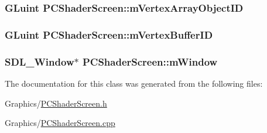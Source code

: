 \subsubsection[{\texorpdfstring{m\+Vertex\+Array\+Object\+ID}{mVertexArrayObjectID}}]{\setlength{\rightskip}{0pt plus 5cm}G\+Luint P\+C\+Shader\+Screen\+::m\+Vertex\+Array\+Object\+ID\hspace{0.3cm}{\ttfamily [private]}}\hypertarget{classPCShaderScreen_a3b4261546ea335e52da92f01db58ad4f}{}\label{classPCShaderScreen_a3b4261546ea335e52da92f01db58ad4f}
\subsubsection[{\texorpdfstring{m\+Vertex\+Buffer\+ID}{mVertexBufferID}}]{\setlength{\rightskip}{0pt plus 5cm}G\+Luint P\+C\+Shader\+Screen\+::m\+Vertex\+Buffer\+ID\hspace{0.3cm}{\ttfamily [private]}}\hypertarget{classPCShaderScreen_aab7c077141f13b13027c0e798e4457c2}{}\label{classPCShaderScreen_aab7c077141f13b13027c0e798e4457c2}
\subsubsection[{\texorpdfstring{m\+Window}{mWindow}}]{\setlength{\rightskip}{0pt plus 5cm}S\+D\+L\+\_\+\+Window$\ast$ P\+C\+Shader\+Screen\+::m\+Window\hspace{0.3cm}{\ttfamily [private]}}\hypertarget{classPCShaderScreen_a0edede4203082cd3891b3178c3bc0def}{}\label{classPCShaderScreen_a0edede4203082cd3891b3178c3bc0def}


The documentation for this class was generated from the following files\+:\begin{DoxyCompactItemize}
\item 
Graphics/\hyperlink{PCShaderScreen_8h}{P\+C\+Shader\+Screen.\+h}\item 
Graphics/\hyperlink{PCShaderScreen_8cpp}{P\+C\+Shader\+Screen.\+cpp}\end{DoxyCompactItemize}
